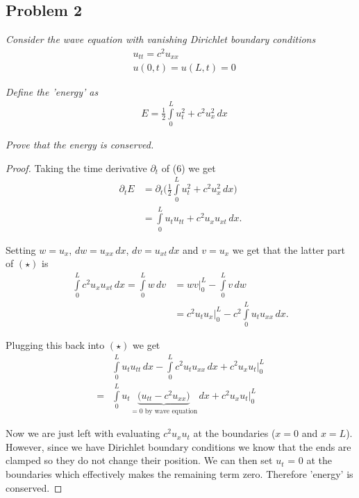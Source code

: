 \documentclass[10pt]{article}
\theoremstyle{remark}
\begin{document}
\newpage

\subsection*{Problem 2}

\textit{Consider the wave equation with vanishing Dirichlet boundary conditions}
\begin{align}
	& u_{tt} = c^2u_{xx} \\
	& u(0,t) = u(L,t) = 0	 
\end{align}

\textit{Define the 'energy' as}
\begin{align}
	& E = \frac{1}{2}\int\limits_{0}^{L} u_{t}^2 + c^2u_x^2 \, dx
\end{align}

\textit{Prove that the energy is conserved.} 

\begin{proof}
Taking the time derivative $\partial_t$ of (6) we get
\begin{align*}
	\partial_t E & = \partial_t \bigg( \frac{1}{2}\int\limits_0^L u_t^2 + c^2 u_x^2 \, dx \bigg) \\
	& = \int\limits_0^L u_t u_{tt} + c^2 u_x u_{xt} \, dx. \tag{$\star$}
\end{align*} 

Setting $w = u_x$, ${dw} = u_{xx} \, dx$, ${dv} = u_{xt} \, dx$ and $v = u_x$ we get that the latter part of $(\star)$ is
\begin{align*}
	\int\limits_0^L c^2u_xu_{xt} \,dx = \int\limits_0^L w \, dv & = wv\bigg\vert_0^L - \int\limits_0^L v \, dw \\
	& = c^2u_tu_x\bigg\vert_0^L - c^2\int\limits_0^L u_tu_{xx} \, dx. 
\end{align*}

Plugging this back into $(\star)$ we get
\begin{align*}
	& \int\limits_0^L u_t u_{tt} \, dx - \int\limits_0^L c^2u_tu_{xx} \, dx + c^2u_xu_t\bigg\vert_0^L \\
	= & \int\limits_0^L u_t\underbrace{\bigg( u_{tt} - c^2u_{xx} \bigg)}_{= 0 \text{ by wave equation}} \, dx + c^2u_xu_t\bigg\vert_0^L
\end{align*}

Now we are just left with evaluating $c^2u_xu_t$ at the boundaries ($x = 0$ and $x = L$). However, since we have Dirichlet boundary conditions we know that the ends are clamped so they do not change their position. We can then set $u_t$ = 0 at the boundaries which effectively makes the remaining term zero. Therefore 'energy' is conserved.
\end{proof}
\end{document}
